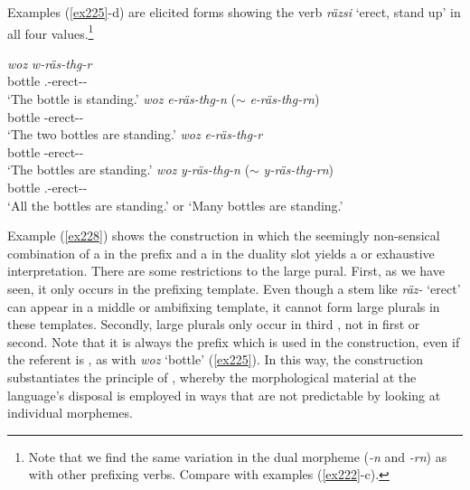 Examples (\ref{ex225}-d) are elicited forms showing the  verb \emph{räzsi} `erect, stand up' in all four  values.\footnote{Note that we find the same variation in the dual morpheme (\emph{-n} and \emph{-rn}) as with other prefixing verbs. Compare with examples (\ref{ex222}-c).}

\begin{exe}
\ex
\begin{xlist}
	\ex
	\gll \emph{woz} \emph{w-räs-thg-r}\\
	bottle \Tsg.\F-erect-\Stat-\Ndu\\
	\trans `The bottle is standing.'
	\label{ex225}
	\ex
	\gll \emph{woz} \emph{e-räs-thg-n} ($\sim$ \emph{e-räs-thg-rn})\\
	bottle \Stnsg-erect-\Stat-\Du\\
	\trans `The two bottles are standing.'
	\label{ex226}
	\ex
	\gll \emph{woz} \emph{e-räs-thg-r}\\
	bottle \Stnsg-erect-\Stat-\Ndu\\
	\trans `The bottles are standing.'
	\label{ex227}
	\ex
	\gll \emph{woz} \emph{y-räs-thg-n} ($\sim$ \emph{y-räs-thg-rn})\\
	bottle \Tsg.\Masc-erect-\Stat-\Du\\
	\trans `All the bottles are standing.' or `Many bottles are standing.'
	\label{ex228}
\end{xlist}
\end{exe}

Example (\ref{ex228}) shows the  construction in which the seemingly non-sensical combination of a  in the  prefix and a  in the duality slot yields a  or exhaustive  interpretation. There are some restrictions to the large pural. First, as we have seen, it only occurs in the prefixing template. Even though a stem like \emph{räz-} `erect' can appear in a middle or ambifixing template, it cannot form large plurals in these templates. Secondly, large plurals only occur in third , not in first or second. Note that it is always the  prefix which is used in the  construction, even if the referent is , as with \emph{woz} `bottle' (\ref{ex225}). In this way, the  construction substantiates the principle of , whereby the morphological material at the language's disposal is employed in ways that are not predictable by looking at individual morphemes.

